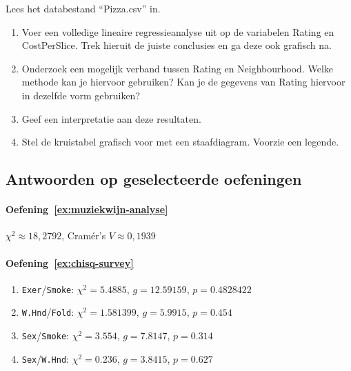 \begin{exercise}
  \label{ex:pizza}
  Lees het databestand ``Pizza.csv'' in.
  \begin{enumerate}
    \item Voer een volledige lineaire regressieanalyse uit op de variabelen Rating en CostPerSlice. Trek hieruit de juiste conclusies en ga deze ook grafisch na.
    \item Onderzoek een mogelijk verband tussen Rating en Neighbourhood. Welke methode kan je hiervoor gebruiken? Kan je de gegevens van Rating hiervoor in dezelfde vorm gebruiken?
    \item Geef een interpretatie aan deze resultaten.
    \item Stel de kruistabel grafisch voor met een staafdiagram.  Voorzie een legende.
  \end{enumerate}
\end{exercise}





\subsection{Antwoorden op geselecteerde oefeningen}
\label{ssec:analyse-2-variabelen-oplossingen}

\paragraph{Oefening~\ref{ex:muziekwijn-analyse}}

$\chi^2 \approx 18,2792$, Cramér's $V \approx 0,1939$

\paragraph{Oefening~\ref{ex:chisq-survey}}

\begin{enumerate}
  \item \texttt{Exer}/\texttt{Smoke}: $\chi^2 = 5.4885$, $g = 12.59159$, $p = 0.4828422$
  \item \texttt{W.Hnd}/\texttt{Fold}: $\chi^2 = 1.581399$, $g = 5.9915$, $p = 0.454$
  \item \texttt{Sex}/\texttt{Smoke}: $\chi^2 = 3.554$, $g = 7.8147$, $p = 0.314$
  \item \texttt{Sex}/\texttt{W.Hnd}: $\chi^2 = 0.236$, $g = 3.8415$, $p = 0.627$
\end{enumerate}

